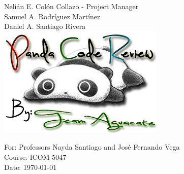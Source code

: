\begin{titlepage}
\begin{center}
Nelián E. Colón Collazo - Project Manager \\
Samuel A. Rodríguez Martínez \\
Daniel A. Santiago Rivera \\[1.5cm]

\includegraphics[scale=1.25]{img/pandaLogoTeamAguacate}\\[1cm]

\vfill

For: Professors Nayda Santiago and José Fernando Vega \\
Course: ICOM 5047 \\
Date: \today






\end{center}

\end{titlepage}

